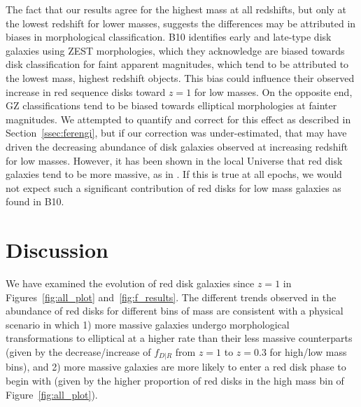 \documentclass[useAMS,usenatbib]{mn2e}
\begin{document}
The fact that our results agree for the highest mass at all redshifts, but only at the lowest redshift for lower masses, suggests the differences may be attributed in biases in morphological classification. B10 identifies early and late-type disk galaxies using ZEST \citep{Scarlata2007} morphologies, which they acknowledge are biased towards disk classification for faint apparent magnitudes, which tend to be attributed to the lowest mass, highest redshift objects. This bias could influence their observed increase in red sequence disks toward $z=1$ for low masses. On the opposite end, GZ classifications tend to be biased towards elliptical morphologies at fainter magnitudes. We attempted to quantify and correct for this effect as described in Section~\ref{ssec:ferengi}, but if our correction was under-estimated, that may have driven the decreasing abundance of disk galaxies observed at increasing redshift for low masses. However, it has been shown in the local Universe that red disk galaxies tend to be more massive, as in \citet{Masters2011}. If this is true at all epochs, we would not expect such a significant contribution of red disks for low mass galaxies as found in B10.

\section{Discussion}
\label{sec:discussion}
We have examined the evolution of red disk galaxies since $z=1$ in Figures~\ref{fig:all_plot} and~\ref{fig:f_results}. The different trends observed in the abundance of red disks for different bins of mass are consistent with a physical scenario in which 1) more massive galaxies undergo morphological transformations to elliptical at a higher rate than their less massive counterparts (given by the decrease/increase of $f_{D|R}$ from $z=1$ to $z=0.3$ for high/low mass bins), and 2) more massive galaxies are more likely to enter a red disk phase to begin with (given by the higher proportion of red disks in the high mass bin of Figure~\ref{fig:all_plot}). 
\end{document}
